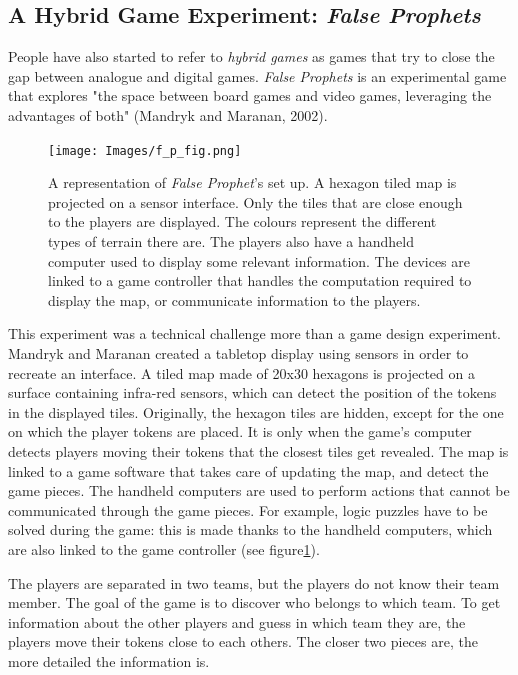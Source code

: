 \subsection{A Hybrid Game Experiment: \textit{False Prophets}}
People have also started to refer to \textit{hybrid games} as games that try to close the gap between analogue and digital games. \textit{False Prophets} is an experimental game that explores "the space between board games and video games, leveraging the advantages of both" (Mandryk and Maranan, 2002)\cite{art:prophets}. 

\begin{figure}[!ht]
    \centering
    \texttt{[image: Images/f\_p\_fig.png]}
    \caption{A representation of \textit{False Prophet}'s set up. A hexagon tiled map is projected on a sensor interface. Only the tiles that are close enough to the players are displayed. The colours represent the different types of terrain there are. The players also have a handheld computer used to display some relevant information. The devices are linked to a game controller that handles the computation required to display the map, or communicate information to the players.}
    \label{fig:falseprophet}
\end{figure}

This experiment was a technical challenge more than a game design experiment. Mandryk and Maranan created a tabletop display using sensors in order to recreate an interface. A tiled map made of 20x30 hexagons is projected on a surface containing infra-red sensors, which can detect the position of the tokens in the displayed tiles. Originally, the hexagon tiles are hidden, except for the one on which the player tokens are placed. It is only when the game's computer detects players moving their tokens that the closest tiles get revealed. The map is linked to a game software that takes care of updating the map, and detect the game pieces. The handheld computers are used to perform actions that cannot be communicated through the game pieces. For example, logic puzzles have to be solved during the game: this is made thanks to the handheld computers, which are also linked to the game controller (see figure\ref{fig:falseprophet}). 

The players are separated in two teams, but the players do not know their team member. The goal of the game is to discover who belongs to which team. To get information about the other players and guess in which team they are, the players move their tokens close to each others. The closer two pieces are, the more detailed the information is. 

